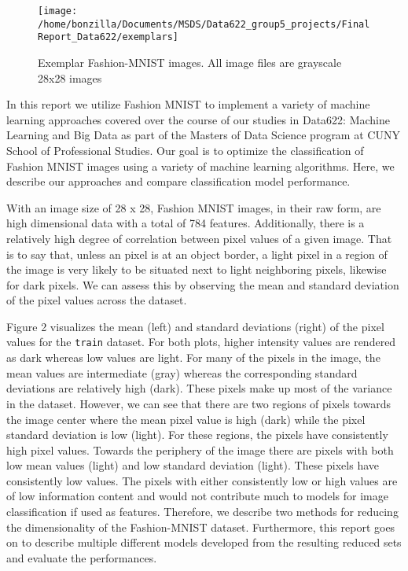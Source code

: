 \documentclass{article}
\begin{document}
\begin{figure}

{\centering \texttt{[image: /home/bonzilla/Documents/MSDS/Data622\_group5\_projects/FinalReport\_Data622/exemplars]} 

}

\caption{Exemplar Fashion-MNIST images. All image files are grayscale 28x28 images}\label{fig:unnamed-chunk-1}
\end{figure}

In this report we utilize Fashion MNIST to implement a variety of
machine learning approaches covered over the course of our studies in
Data622: Machine Learning and Big Data as part of the Masters of Data
Science program at CUNY School of Professional Studies. Our goal is to
optimize the classification of Fashion MNIST images using a variety of
machine learning algorithms. Here, we describe our approaches and
compare classification model performance.

With an image size of 28 x 28, Fashion MNIST images, in their raw form,
are high dimensional data with a total of 784 features. Additionally,
there is a relatively high degree of correlation between pixel values of
a given image. That is to say that, unless an pixel is at an object
border, a light pixel in a region of the image is very likely to be
situated next to light neighboring pixels, likewise for dark pixels. We
can assess this by observing the mean and standard deviation of the
pixel values across the dataset.

Figure 2 visualizes the mean (left) and standard deviations (right) of
the pixel values for the \texttt{train} dataset. For both plots, higher
intensity values are rendered as dark whereas low values are light. For
many of the pixels in the image, the mean values are intermediate (gray)
whereas the corresponding standard deviations are relatively high
(dark). These pixels make up most of the variance in the dataset.
However, we can see that there are two regions of pixels towards the
image center where the mean pixel value is high (dark) while the pixel
standard deviation is low (light). For these regions, the pixels have
consistently high pixel values. Towards the periphery of the image there
are pixels with both low mean values (light) and low standard deviation
(light). These pixels have consistently low values. The pixels with
either consistently low or high values are of low information content
and would not contribute much to models for image classification if used
as features. Therefore, we describe two methods for reducing the
dimensionality of the Fashion-MNIST dataset. Furthermore, this report
goes on to describe multiple different models developed from the
resulting reduced sets and evaluate the performances.
\end{document}
